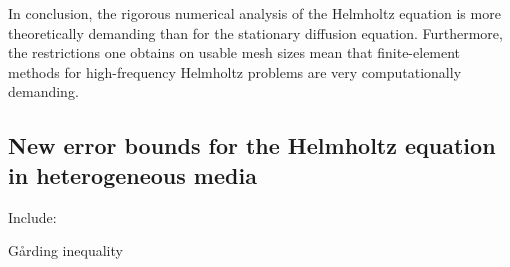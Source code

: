 In conclusion, the rigorous numerical analysis of the Helmholtz equation is more theoretically demanding than for the stationary diffusion equation. Furthermore, the restrictions one obtains on usable mesh sizes mean that finite-element methods for high-frequency Helmholtz problems are very computationally demanding.






\subsection{New error bounds for the Helmholtz equation in heterogeneous media}\label{sec:heterr}

  Include:
  \bit
\item G\r{a}rding inequality
  \eit
